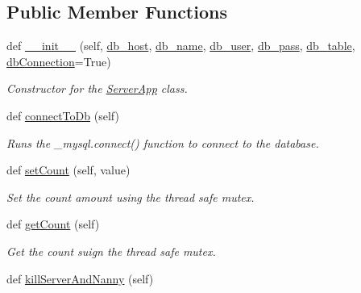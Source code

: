 \subsection*{Public Member Functions}
\begin{DoxyCompactItemize}
\item 
def \mbox{\hyperlink{class_server_app_1_1_server_app_ad21d376322b7fed132f39b87d23ccaea}{\+\_\+\+\_\+init\+\_\+\+\_\+}} (self, \mbox{\hyperlink{class_server_app_1_1_server_app_af133cccb1424b84b45c97e9d03471d17}{db\+\_\+host}}, \mbox{\hyperlink{class_server_app_1_1_server_app_a4fbf66ec391567038cfb6dad6d929708}{db\+\_\+name}}, \mbox{\hyperlink{class_server_app_1_1_server_app_a2991ea2a13aedd112c170df7f5a49265}{db\+\_\+user}}, \mbox{\hyperlink{class_server_app_1_1_server_app_ae409845095d3454690497af61592b3e9}{db\+\_\+pass}}, \mbox{\hyperlink{class_server_app_1_1_server_app_a759e0eaa4be95b98b3c5be7d7fa2eb6e}{db\+\_\+table}}, \mbox{\hyperlink{class_server_app_1_1_server_app_a541e00ca3089461e9ee7f02b3a1fdea9}{db\+Connection}}=True)
\begin{DoxyCompactList}\small\item\em Constructor for the \mbox{\hyperlink{class_server_app_1_1_server_app}{Server\+App}} class. \end{DoxyCompactList}\item 
def \mbox{\hyperlink{class_server_app_1_1_server_app_a4008e39a65dde07e7e69c2eef0b0f578}{connect\+To\+Db}} (self)
\begin{DoxyCompactList}\small\item\em Runs the \+\_\+mysql.\+connect() function to connect to the database. \end{DoxyCompactList}\item 
def \mbox{\hyperlink{class_server_app_1_1_server_app_a665a6527552ef9b8ba12e196b9884655}{set\+Count}} (self, value)
\begin{DoxyCompactList}\small\item\em Set the count amount using the thread safe mutex. \end{DoxyCompactList}\item 
def \mbox{\hyperlink{class_server_app_1_1_server_app_a5b6f47399a9434d1a3b86f89a114a44c}{get\+Count}} (self)
\begin{DoxyCompactList}\small\item\em Get the count suign the thread safe mutex. \end{DoxyCompactList}\item 
def \mbox{\hyperlink{class_server_app_1_1_server_app_acee9930736fb8b9ff4d1229cfede83e4}{kill\+Server\+And\+Nanny}} (self)

\end{DoxyCompactItemize}
